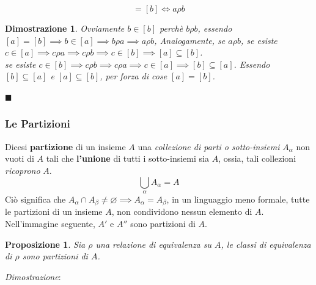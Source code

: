 \documentclass[12pt, letterpaper]{article}
\begin{document}
\begin{theorem}
\begin{equation}
    [a]=[b] \iff a\rho b
\end{equation}
\end{theorem}
\newtheorem{dimostrazione}{Dimostrazione}
\begin{dimostrazione}
    Ovviamente \(b\in [b]\) perchè \(b\rho b\), essendo  \([a]=[b] \implies b \in [a]\implies b\rho a\implies a\rho b\),
    Analogamente, se \(a\rho b\), se esiste \(c \in [a]\implies c\rho a \implies c \rho b \implies c\in [b]\implies
    [a]\subseteq[b]\).\\
    se esiste \(c \in [b]\implies c\rho b \implies c \rho a \implies c\in [a]\implies
    [b]\subseteq[a]\). Essendo \( [b]\subseteq[a]\) e \( [a]\subseteq[b]\), per forza di cose \([a]=[b]\).
\end{dimostrazione}
\raggedleft\(\blacksquare\)\newpage
\raggedright \subsubsection{Le Partizioni}
Dicesi \textbf{partizione} di un insieme \(A\) una \textit{collezione di parti o sotto-insiemi} \(A_\alpha\) non 
vuoti di \(A\) tali che \textbf{l'unione} di tutti i sotto-insiemi sia \(A\), ossia, tali collezioni \textit{ricoprono} \(A\).
\begin{equation}
    \bigcup_\alpha A_\alpha = A 
\end{equation}
Ciò significa che \(A_\alpha \cap A_\beta \ne \varnothing \implies A_\alpha = A_\beta\), in un linguaggio meno formale, tutte le partizioni 
di un insieme \(A\), non condividono nessun elemento di \(A\). Nell'immagine seguente, \(A'\) e \(A''\) sono partizioni di \(A\).
\begin{figure}[h]
\end{figure}
\newtheorem{prop}{Proposizione}
\begin{prop}
    Sia \(\rho\) una relazione di equivalenza su \(A\), le classi di equivalenza di \(\rho\) sono
    partizioni di \(A\).
\end{prop}
\textit{Dimostrazione}:\\
\end{document}
